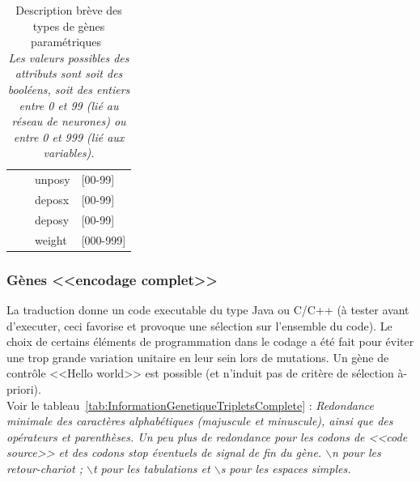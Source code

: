 \documentclass[11pt,twoside,a4paper]{article}
\begin{document}
\begin{table}[h]
\begin{center}
\begin{scriptsize}
\begin{tabular}{|p{}|c|p{}|p{}|}
	\cline{3-4} %
								&				&	unposy		& [00-99] \\
	\cline{3-4} %
								&				&	deposx		& [00-99] \\
	\cline{3-4} %
								&				&	deposy		& [00-99] \\
	\cline{3-4} %
								&				&	weight		& [000-999] \\
	\hline \hline
	\end{tabular}
	\end{scriptsize} \end{center}
	\caption[Description br{\`e}ve des types de g{\`e}nes param{\'e}triques]
		{Description br{\`e}ve des types de g{\`e}nes param{\'e}triques~\\
		\emph{Les valeurs possibles des attributs sont soit des bool{\'e}ens, soit des entiers entre 0 et 99 (li{\'e} au r{\'e}seau de neurones) ou entre 0 et 999 (li{\'e} aux variables). }}
	\label{tab:briefDescriptionGeneTypes}
\end{table}


\subsubsection{G{\`e}nes <<encodage complet>>}

La traduction donne un code executable du type Java ou C/C++ ({\`a} tester avant d'executer, ceci favorise et provoque une s{\'e}lection sur l'ensemble du code). Le choix de certains {\'e}l{\'e}ments de programmation dans le codage a {\'e}t{\'e} fait pour {\'e}viter une trop grande variation unitaire en leur sein lors de mutations. Un g{\`e}ne de contr{\^o}le <<Hello world>> est possible (et n'induit pas de crit{\`e}re de s{\'e}lection {\`a}-priori).~\\

Voir le tableau~\ref{tab:InformationGenetiqueTripletsComplete} : \emph{Redondance minimale des caract{\`e}res alphab{\'e}tiques (majuscule et minuscule), ainsi que des op{\'e}rateurs et parenth{\`e}ses. Un peu plus de redondance pour les codons de <<code source>> et des codons stop {\'e}ventuels de signal de fin du g{\`e}ne. $\backslash$n pour les retour-chariot ; $\backslash$t pour les tabulations et $\backslash$s pour les espaces simples. }

\end{document}
